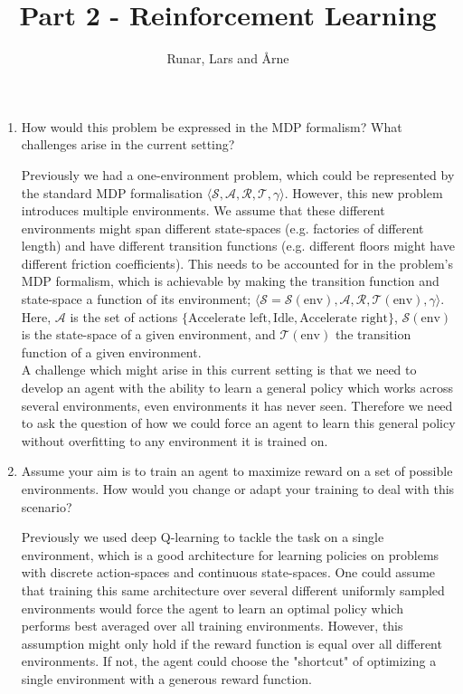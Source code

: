 \documentclass{article}
\title{\vspace{-5.0cm}Part 2 - Reinforcement Learning\vspace{-0.3cm}}
\author{Runar, Lars and Årne\vspace{-0.5cm}}
\date{}
\begin{document}
\maketitle
\vspace{-1.0cm}

\begin{enumerate}

\item{How would this problem be expressed in the MDP formalism? What challenges arise in the current setting?}

Previously we had a one-environment problem, which could be represented by the standard MDP formalisation $\langle \mathcal{S}, \mathcal{A}, \mathcal{R}, \mathcal{T}, \gamma \rangle$. However, this new problem introduces multiple environments. We assume that these different environments might span different state-spaces (e.g. factories of different length) and have different transition functions (e.g. different floors might have different friction coefficients). This needs to be accounted for in the problem's MDP formalism, which is achievable by making the transition function and state-space a function of its environment; $\langle \mathcal{S} = \mathcal{S}(\text{env}), \mathcal{A}, \mathcal{R}, \mathcal{T}(\text{env}), \gamma \rangle$. Here, $\mathcal{A}$ is the set of actions $\{\text{Accelerate left}, \text{Idle}, \text{Accelerate right}\}$, $\mathcal{S}(\text{env})$ is the state-space of a given environment, and $\mathcal{T}(\text{env})$ the transition function of a given environment.
\\[2pt]
A challenge which might arise in this current setting is that we need to develop an agent with the ability to learn a general policy which works across several environments, even environments it has never seen. Therefore we need to ask the question of how we could force an agent to learn this general policy without overfitting to any environment it is trained on.

\item{Assume your aim is to train an agent to maximize reward on a set of possible environments. How would you change or adapt your training to deal with this scenario?}

Previously we used deep Q-learning to tackle the task on a single environment, which is a good architecture for learning policies on problems with discrete action-spaces and continuous state-spaces. One could assume that training this same architecture over several different uniformly sampled environments would force the agent to learn an optimal policy which performs best averaged over all training environments. However, this assumption might only hold if the reward function is equal over all different environments. If not, the agent could choose the "shortcut" of optimizing a single environment with a generous reward function.


\end{enumerate}
\end{document}
